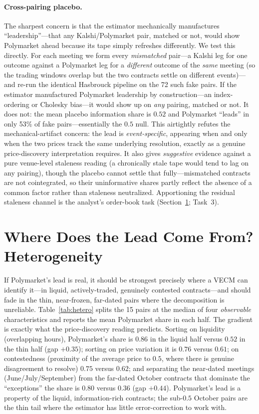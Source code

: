 \documentclass[12pt]{article}
\begin{document}
\paragraph{Cross-pairing placebo.} The sharpest concern is that the estimator mechanically
manufactures ``leadership''---that any Kalshi/Polymarket pair, matched or not, would show
Polymarket ahead because its tape simply refreshes differently. We test this directly. For each
meeting we form every \emph{mismatched} pair---a Kalshi leg for one outcome against a Polymarket
leg for a \emph{different} outcome of the \emph{same} meeting (so the trading windows overlap but
the two contracts settle on different events)---and re-run the identical Hasbrouck pipeline on the
72 such fake pairs. If the estimator manufactured Polymarket leadership by construction---an
index-ordering or Cholesky bias---it would show up on \emph{any} pairing, matched or not. It does
not: the mean placebo information share is $0.52$ and Polymarket ``leads'' in only 53\% of fake
pairs---essentially the $0.5$ null. This airtightly refutes the mechanical-artifact concern: the
lead is \emph{event-specific}, appearing when and only when the two prices track the same
underlying resolution, exactly as a genuine price-discovery interpretation requires. It also gives
\emph{suggestive} evidence against a pure venue-level staleness reading (a chronically stale tape
would tend to lag on any pairing), though the placebo cannot settle that fully---mismatched
contracts are not cointegrated, so their uninformative shares partly reflect the absence of a
common factor rather than staleness neutralized. Apportioning the residual staleness channel is
the analyst's order-book task (Section~\ref{sec:het}; Task~3).

\section{Where Does the Lead Come From? Heterogeneity}\label{sec:het}
If Polymarket's lead is real, it should be strongest precisely where a VECM can identify it---in
liquid, actively-traded, genuinely contested contracts---and should fade in the thin, near-frozen,
far-dated pairs where the decomposition is unreliable. Table~\ref{tab:hetero} splits the 15 pairs
at the median of four \emph{observable} characteristics and reports the mean Polymarket share in
each half. The gradient is exactly what the price-discovery reading predicts. Sorting on liquidity
(overlapping hours), Polymarket's share is $0.86$ in the liquid half versus $0.52$ in the thin half
(gap $+0.35$); sorting on price variation it is $0.76$ versus $0.61$; on contestedness (proximity
of the average price to $0.5$, where there is genuine disagreement to resolve) $0.75$ versus $0.62$;
and separating the near-dated meetings (June/July/September) from the far-dated October contracts
that dominate the ``exceptions'' the share is $0.80$ versus $0.36$ (gap $+0.44$). Polymarket's lead
is a property of the liquid, information-rich contracts; the sub-$0.5$ October pairs are the thin
tail where the estimator has little error-correction to work with.
\end{document}
